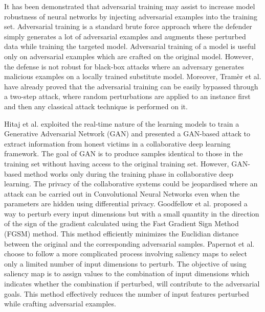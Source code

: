 It has been demonstrated \cite{Szegedy13,Goodfellow14, LyuHL15, ShokriSSS17, ShahamYN18} that adversarial training may assist to increase model robustness of neural networks by injecting adversarial examples into the training set. Adversarial training is a standard brute force approach where the defender simply generates a lot of adversarial examples and augments these perturbed data while training the targeted model. Adversarial training of a model is useful only on adversarial examples which are crafted on the original model. However, the defense is not robust for black-box attacks \cite{NarodytskaK17, PapernotMGJCS17} where an adversary generates malicious examples on a locally trained substitute model. Moreover, Tram{\`{e}}r et al. \cite{TramerKPBM17} have already proved that the adversarial training can be easily bypassed through a two-step attack, where random perturbations are applied to an instance first and then any classical attack technique is performed on it.

Hitaj et al. \cite{HitajAP17} exploited the real-time nature of the learning models to train a Generative Adversarial Network (GAN) and presented a GAN-based attack to extract information from honest victims in a collaborative deep learning framework. The goal of GAN is to produce samples identical to those in the training set without having access to the original training set. However, GAN-based method works only during the training phase in collaborative deep learning. The privacy of the collaborative systems could be jeopardised where an attack can be carried out in Convolutional Neural Networks even when the parameters are hidden using differential privacy. Goodfellow et al. \cite{Goodfellow14} proposed a way to perturb every input dimensions but with a small quantity in the direction of the sign of the gradient calculated using the Fast Gradient Sign Method (FGSM) method. This method efficiently minimizes the Euclidian distance between the original and the corresponding adversarial samples. Papernot et al. \cite{PapernotMJFCS16} choose to follow a more complicated process involving saliency maps to select only a limited number of input dimensions to perturb. The objective of using saliency map is to assign values to the combination of input dimensions which indicates whether the combination if perturbed, will contribute to the adversarial goals. This method effectively reduces the number of input features perturbed while crafting adversarial examples.

